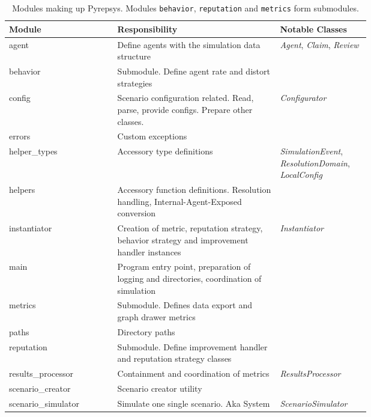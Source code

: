 \documentclass[%
    ]{\PathToTumTemplate/thesis/tum_thesis}
\begin{document}


\begin{table}[tbp]
\centering
\begin{tabular}{@{}lp{0.45\linewidth}p{0.25\linewidth}@{}}
\toprule
\textbf{Module} & \textbf{Responsibility} & \textbf{Notable Classes}    \\ \midrule
agent               & Define agents with the simulation data structure & \emph{Agent}, \emph{Claim}, \emph{Review} \\
behavior            & Submodule. Define agent rate and distort strategies & \\ 
config              & Scenario configuration related. Read, parse, provide configs. Prepare other classes. & \emph{Configurator}\\
errors              & Custom exceptions & \\
helper\_types       & Accessory type definitions & \mbox{\emph{SimulationEvent}}, \mbox{\emph{ResolutionDomain}}, \mbox{\emph{LocalConfig}} \\
helpers             & Accessory function definitions. Resolution handling, Internal-Agent-Exposed conversion & \\
instantiator        & Creation of metric, reputation strategy, behavior strategy and improvement handler instances & \emph{Instantiator} \\
main                & Program entry point, preparation of logging and directories, coordination of simulation & \\
metrics             & Submodule. Defines data export and graph drawer metrics & \\
paths               & Directory paths & \\
reputation          & Submodule. Define improvement handler and reputation strategy classes & \\
results\_processor  &Containment and coordination of metrics & \emph{ResultsProcessor} \\
scenario\_creator   &Scenario creator utility & \\
scenario\_simulator &Simulate one single scenario. Aka System & \emph{ScenarioSimulator} \\
\bottomrule
\end{tabular}
\caption{
	Modules making up Pyrepsys.
	Modules \texttt{behavior}, \texttt{reputation} and \texttt{metrics} form submodules.
}
\label{tab:pyrepsys_modules}
\end{table}
\end{document}
